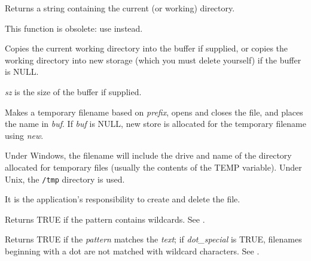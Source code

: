 \label{wxgetcwd}


Returns a string containing the current (or working) directory.



This function is obsolete: use  instead.

Copies the current working directory into the buffer if supplied, or
copies the working directory into new storage (which you must delete yourself)
if the buffer is NULL.

{\it sz} is the size of the buffer if supplied.




Makes a temporary filename based on {\it prefix}, opens and closes the file,
and places the name in {\it buf}. If {\it buf} is NULL, new store
is allocated for the temporary filename using {\it new}.

Under Windows, the filename will include the drive and name of the
directory allocated for temporary files (usually the contents of the
TEMP variable). Under Unix, the {\tt /tmp} directory is used.

It is the application's responsibility to create and delete the file.

\label{wxiswild}


Returns TRUE if the pattern contains wildcards. See .

\label{wxmatchwild}


Returns TRUE if the {\it pattern}\/ matches the {\it text}\/; if {\it
dot\_special}\/ is TRUE, filenames beginning with a dot are not matched
with wildcard characters. See .

